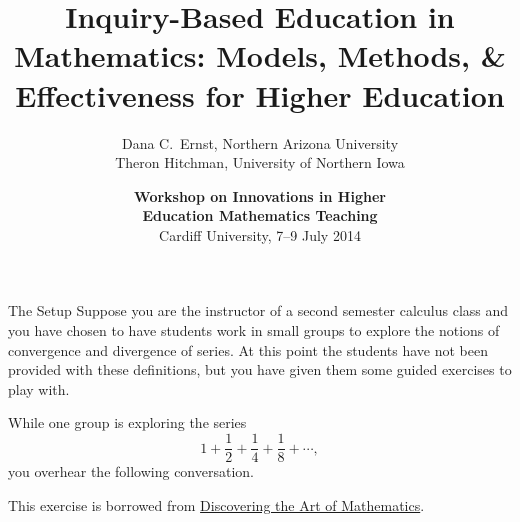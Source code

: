 \documentclass[10pt,handout]{beamer}
\begin{document}

\title[Inquiry-Based Education in Mathematics]
{\large \textbf{Inquiry-Based Education in Mathematics: Models, Methods, \& Effectiveness for Higher Education}}
\author[D.C.~Ernst and TJ Hitchman]{Dana C.~Ernst, Northern Arizona University\\
Theron Hitchman, University of Northern Iowa}

\vspace{1em}

\date{\textbf{Workshop on Innovations in Higher\\ Education Mathematics Teaching}\\
Cardiff University, 7--9 July 2014}

\frame{\titlepage}


\begin{frame}

\vfill
\begin{center}
\end{center}
\vfill

\end{frame}


\begin{frame}

\begin{block}{The Setup}
Suppose you are the instructor of a second semester calculus class and you have chosen to have students work in small groups to explore the notions of convergence and divergence of series.  At this point the students have not been provided with these definitions, but you have given them some guided exercises to play with.

\vspace{1em}

While one group is exploring the series
\[
1+\frac{1}{2}+\frac{1}{4}+\frac{1}{8}+\cdots, 
\]
you overhear the following conversation.
\end{block}

\vspace{1em}

This exercise is borrowed from \href{http://www.artofmathematics.org/}{Discovering the Art of Mathematics}.

\end{frame}
\end{document}
